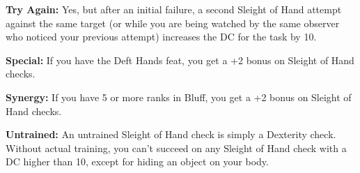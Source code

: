 \textbf{Try Again:} Yes, but after an initial failure, a second Sleight of Hand attempt against the same target (or while you are being watched by the same observer who noticed your previous attempt) increases the DC for the task by 10.

\textbf{Special:} If you have the Deft Hands feat, you get a +2 bonus on Sleight of Hand checks.

\textbf{Synergy:} If you have 5 or more ranks in Bluff, you get a +2 bonus on Sleight of Hand checks.

\textbf{Untrained:} An untrained Sleight of Hand check is simply a Dexterity check. Without actual training, you can't succeed on any Sleight of Hand check with a DC higher than 10, except for hiding an object on your body.

